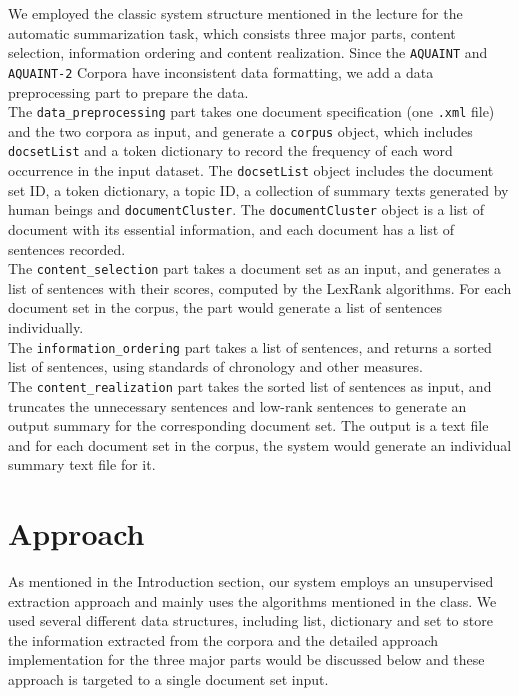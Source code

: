 \documentclass[11pt]{article}
\begin{document}
We employed the classic system structure mentioned in the lecture for the automatic summarization task, which consists three major parts, content selection, information ordering and content realization. Since the \texttt{AQUAINT} and \texttt{AQUAINT-2} Corpora have inconsistent data formatting, we add a data preprocessing part to prepare the data.  \\
\indent
The \texttt{data\_preprocessing} part takes one document specification (one \texttt{.xml} file) and the two corpora as input, and generate a \texttt{corpus} object, which includes \texttt{docsetList} and a token dictionary to record the frequency of each word occurrence in the input dataset. The \texttt{docsetList} object includes the document set ID, a token dictionary, a topic ID, a collection of summary texts generated by human beings and \texttt{documentCluster}. The \texttt{documentCluster} object is a list of document with its essential information, and each document has a list of sentences recorded.\\
\indent
The \texttt{content\_selection} part takes a document set as an input, and generates a list of sentences with their scores, computed by the LexRank algorithms. For each document set in the corpus, the part would generate a list of sentences individually.\\
\indent
The \texttt{information\_ordering} part takes a list of sentences, and returns a sorted list of sentences, using standards of chronology and other measures. \\
\indent
The \texttt{content\_realization} part takes the sorted list of sentences as input, and truncates the unnecessary sentences and low-rank sentences to generate an output summary for the corresponding document set. The output is a text file and for each document set in the corpus, the system would generate an individual summary text file for it.

\section{Approach}

As mentioned in the Introduction section, our system employs an unsupervised extraction approach and mainly uses the algorithms mentioned in the class. We used several different data structures, including list, dictionary and set to store the information extracted from the corpora and the detailed approach implementation for the three major parts would be discussed below and these approach is targeted to a single document set input.
\end{document}
